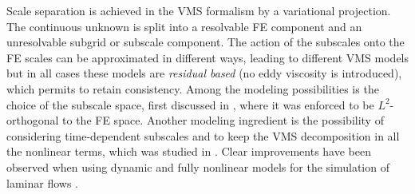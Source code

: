 Scale separation is achieved in the VMS formalism by a variational projection. The continuous unknown is split into a resolvable FE component and an unresolvable subgrid or subscale component. The action of the subscales onto the FE scales can be approximated in different ways, leading to different VMS models but in all cases these models are {\em residual based} (no eddy viscosity is introduced), which permits to retain consistency. Among the modeling possibilities is the choice of the subscale space, first discussed in \cite{codina_stabilization_2000}, where it was enforced to be $L^2$-orthogonal to the FE space. Another modeling ingredient is the possibility of considering time-dependent subscales and to keep the VMS decomposition in all the nonlinear terms, which was studied in \cite{codina_stabilized_2002,codina_time_2007}. Clear improvements have been observed when using dynamic and fully nonlinear models for the simulation of laminar flows \cite{codina_time_2007, Avila2011}.



